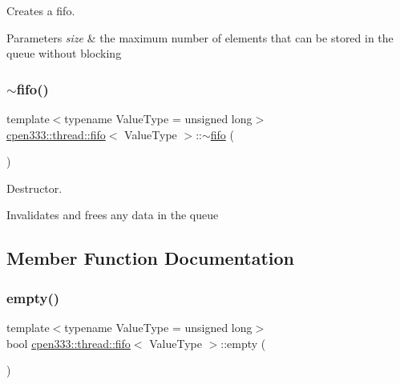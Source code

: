Creates a fifo. 


\begin{DoxyParams}{Parameters}
{\em size} & the maximum number of elements that can be stored in the queue without blocking \\
\hline
\end{DoxyParams}
\mbox{\label{classcpen333_1_1thread_1_1fifo_a2a0c73dacfbb260c31558d81a92d1728}} 
\subsubsection{\texorpdfstring{$\sim$fifo()}{~fifo()}}
{\footnotesize\ttfamily template$<$typename Value\+Type  = unsigned long$>$ \\
\hyperlink{classcpen333_1_1thread_1_1fifo}{cpen333\+::thread\+::fifo}$<$ Value\+Type $>$\+::$\sim$\hyperlink{classcpen333_1_1thread_1_1fifo}{fifo} (\begin{DoxyParamCaption}{ }\end{DoxyParamCaption})\hspace{0.3cm}{\ttfamily [inline]}}



Destructor. 

Invalidates and frees any data in the queue 

\subsection{Member Function Documentation}
\mbox{\label{classcpen333_1_1thread_1_1fifo_aa624c7eefa407c9a69ca55504c377b18}} 
\subsubsection{\texorpdfstring{empty()}{empty()}}
{\footnotesize\ttfamily template$<$typename Value\+Type  = unsigned long$>$ \\
bool \hyperlink{classcpen333_1_1thread_1_1fifo}{cpen333\+::thread\+::fifo}$<$ Value\+Type $>$\+::empty (\begin{DoxyParamCaption}{ }\end{DoxyParamCaption})\hspace{0.3cm}{\ttfamily [inline]}}



